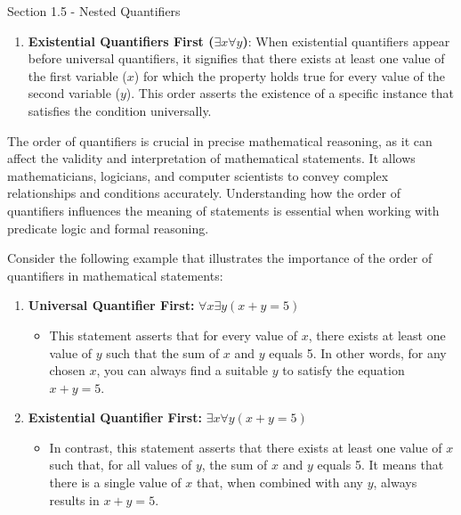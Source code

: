 \begin{notes}{Section 1.5 - Nested Quantifiers}
\begin{enumerate}
        \item \textbf{Existential Quantifiers First (\(\exists x \forall y\))}: When existential quantifiers appear before universal quantifiers, it signifies that there exists at least one value of the first variable (\(x\)) for which the property holds true 
        for every value of the second variable (\(y\)). This order asserts the existence of a specific instance that satisfies the condition universally.
    \end{enumerate}
    
    The order of quantifiers is crucial in precise mathematical reasoning, as it can affect the validity and interpretation of mathematical statements. It allows mathematicians, logicians, and computer scientists to convey complex relationships and conditions 
    accurately. Understanding how the order of quantifiers influences the meaning of statements is essential when working with predicate logic and formal reasoning.
    
    \begin{Highlight}
        Consider the following example that illustrates the importance of the order of quantifiers in mathematical statements:
    
        \begin{enumerate}
            \item \textbf{Universal Quantifier First:} \(\forall x \exists y (x + y = 5)\)
            \begin{itemize}
                \item This statement asserts that for every value of \(x\), there exists at least one value of \(y\) such that the sum of \(x\) and \(y\) equals 5. In other words, for any chosen \(x\), you can always find a suitable \(y\) to satisfy the equation 
                \(x + y = 5\).
            \end{itemize}
    
            \item \textbf{Existential Quantifier First:} \(\exists x \forall y (x + y = 5)\)
            \begin{itemize}
                \item In contrast, this statement asserts that there exists at least one value of \(x\) such that, for all values of \(y\), the sum of \(x\) and \(y\) equals 5. It means that there is a single value of \(x\) that, when combined with any \(y\), 
                always results in \(x + y = 5\).
            \end{itemize}
        \end{enumerate}
    

\end{Highlight}
\end{notes}
